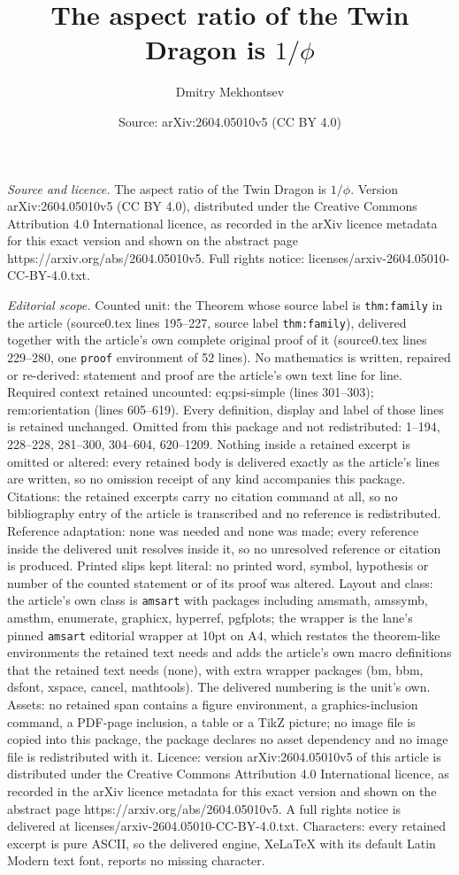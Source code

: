 \documentclass[10pt,a4paper]{amsart}
\title[The aspect ratio of the Twin Dragon is $1/\phi$]{The aspect ratio of the Twin Dragon is $1/\phi$}
\author{Dmitry Mekhontsev}
\date{Source: arXiv:2604.05010v5 (CC BY 4.0)}
\begin{document}
\maketitle

\noindent\emph{Source and licence.} The aspect ratio of the Twin Dragon is $1/\phi$. Version arXiv:2604.05010v5 (CC BY 4.0), distributed under the Creative Commons Attribution 4.0 International licence, as recorded in the arXiv licence metadata for this exact version and shown on the abstract page https://arxiv.org/abs/2604.05010v5. Full rights notice: licenses/arxiv-2604.05010-CC-BY-4.0.txt.\par\smallskip

\noindent\textit{Editorial scope.} Counted unit: the Theorem whose source label is \texttt{thm:family} in the article (source0.tex lines 195--227, source label \texttt{thm:family}), delivered together with the article's own complete original proof of it (source0.tex lines 229--280, one \texttt{proof} environment of 52 lines). No mathematics is written, repaired or re-derived: statement and proof are the article's own text line for line. Required context retained uncounted: eq:psi-simple (lines 301--303); rem:orientation (lines 605--619). Every definition, display and label of those lines is retained unchanged. Omitted from this package and not redistributed: 1--194, 228--228, 281--300, 304--604, 620--1209. Nothing inside a retained excerpt is omitted or altered: every retained body is delivered exactly as the article's lines are written, so no omission receipt of any kind accompanies this package. Citations: the retained excerpts carry no citation command at all, so no bibliography entry of the article is transcribed and no reference is redistributed. Reference adaptation: none was needed and none was made; every reference inside the delivered unit resolves inside it, so no unresolved reference or citation is produced. Printed slips kept literal: no printed word, symbol, hypothesis or number of the counted statement or of its proof was altered. Layout and class: the article's own class is \texttt{amsart} with packages including amsmath, amssymb, amsthm, enumerate, graphicx, hyperref, pgfplots; the wrapper is the lane's pinned \texttt{amsart} editorial wrapper at 10pt on A4, which restates the theorem-like environments the retained text needs and adds the article's own macro definitions that the retained text needs (none), with extra wrapper packages (bm, bbm, dsfont, xspace, cancel, mathtools). The delivered numbering is the unit's own. Assets: no retained span contains a figure environment, a graphics-inclusion command, a PDF-page inclusion, a table or a TikZ picture; no image file is copied into this package, the package declares no asset dependency and no image file is redistributed with it. Licence: version arXiv:2604.05010v5 of this article is distributed under the Creative Commons Attribution 4.0 International licence, as recorded in the arXiv licence metadata for this exact version and shown on the abstract page https://arxiv.org/abs/2604.05010v5. A full rights notice is delivered at licenses/arxiv-2604.05010-CC-BY-4.0.txt. Characters: every retained excerpt is pure ASCII, so the delivered engine, XeLaTeX with its default Latin Modern text font, reports no missing character.
\end{document}
